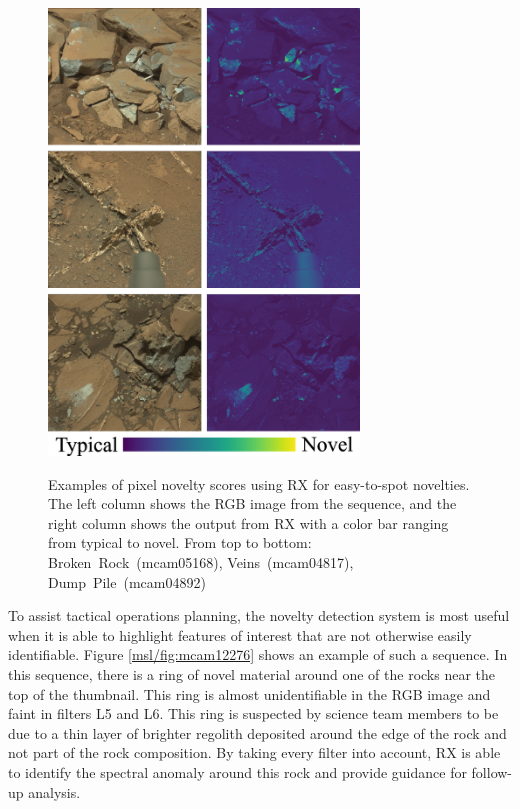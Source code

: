 \begin{figure}
\centering
\includegraphics[width=3.25in]{figs/msl/easy.png}\\
\caption[Examples of Highlighting Novelties with RX for Mastcam Multispectral Images]{Examples of pixel novelty scores using RX for easy-to-spot novelties. The left column shows the RGB image from the sequence, and the right column shows the output from RX with a color bar ranging from typical to novel. From top to bottom: \mbox{Broken Rock (mcam05168)}, \mbox{Veins (mcam04817)}, \mbox{Dump Pile (mcam04892)}}
\label{msl/fig:easyNovel}
\end{figure}

To assist tactical operations planning, the novelty detection system is most useful when it is able to highlight features of interest that are not otherwise easily identifiable. 
Figure \ref{msl/fig:mcam12276} shows an example of such a sequence.
In this sequence, there is a ring of novel material around one of the rocks near the top of the thumbnail. 
This ring is almost unidentifiable in the RGB image and faint in filters L5 and L6. 
This ring is suspected by science team members to be due to a thin layer of brighter regolith deposited around the edge of the rock and not part of the rock composition.
By taking every filter into account, RX is able to identify the spectral anomaly around this rock and provide guidance for follow-up analysis.

